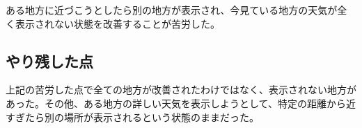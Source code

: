 \documentclass[a4j]{jarticle}
\begin{document}
ある地方に近づこうとしたら別の地方が表示され、今見ている地方の天気が全く表示されない状態を改善することが苦労した。



\subsection{やり残した点}

上記の苦労した点で全ての地方が改善されたわけではなく、表示されない地方があった。その他、ある地方の詳しい天気を表示しようとして、特定の距離から近すぎたら別の場所が表示されるという状態のままだった。


\end{document}

